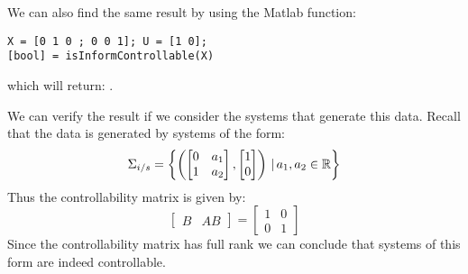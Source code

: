We can also find the same result by using the Matlab function:
\begin{lstlisting}
X = [0 1 0 ; 0 0 1]; U = [1 0];
[bool] = isInformControllable(X)
\end{lstlisting}
which will return: \mon{[ 1 ]}.

We can verify the result if we consider the systems that generate this data. Recall that the data is generated by systems of the form:
\[ \Sigma_{i/s} = \left\{ \left( \begin{bmatrix} 0&a_1 \\ 1&a_2 \end{bmatrix}, \begin{bmatrix} 1 \\ 0 \end{bmatrix} \right) \, | \, a_1, a_2 \in \mathbb{R} \right\} \]
Thus the controllability matrix is given by:
\[ \begin{bmatrix} B& AB \end{bmatrix} = \begin{bmatrix} 1 & 0 \\ 0 & 1 \end{bmatrix} \]
Since the controllability matrix has full rank we can conclude that systems of this form are indeed controllable.
































